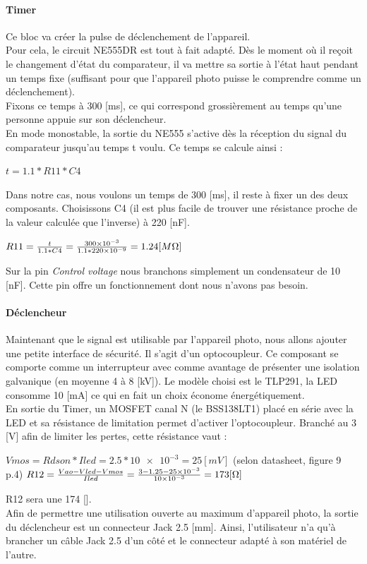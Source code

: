 \documentclass[a4paper,10pt]{article}
\begin{document}
\paragraph{Timer}
Ce bloc va créer la pulse de déclenchement de l'appareil. \\
Pour cela, le circuit NE555DR est tout à fait adapté. Dès le moment où il reçoit le changement d'état du comparateur, il va mettre sa sortie à l'état haut pendant un temps fixe (suffisant pour que l'appareil photo puisse le comprendre comme un déclenchement). \\
Fixons ce temps à 300 [ms], ce qui correspond grossièrement au temps qu'une personne appuie sur son déclencheur. \\
En mode monostable, la sortie du NE555 s'active dès la réception du signal du comparateur jusqu'au temps t voulu. Ce temps se calcule ainsi :
\begin{center}
 $ t = 1.1*R11*C4 $
\end{center}
Dans notre cas, nous voulons un temps de 300 [ms], il reste à fixer un des deux composants. Choisissons C4 (il est plus facile de trouver une résistance proche de la valeur calculée que l'inverse) à 220 [nF].
\begin{center}
 $ R11 = \frac{t}{1.1*C4} = \frac{\num{300e-3}}{1.1*\num{220e-9}} = 1.24 [M\ohm] $
\end{center}
Sur la pin {\itshape Control voltage} nous branchons simplement un condensateur de 10 [nF]. Cette pin offre un fonctionnement dont nous n'avons pas besoin.

\paragraph{Déclencheur}
Maintenant que le signal est utilisable par l'appareil photo, nous allons ajouter une petite interface de sécurité. Il s'agit d'un optocoupleur. Ce composant se comporte comme un interrupteur avec comme avantage de présenter une isolation galvanique (en moyenne 4 à 8 [kV]). Le modèle choisi est le TLP291, la LED consomme 10 [mA] ce qui en fait un choix économe énergétiquement. \\
En sortie du Timer, un MOSFET canal N (le BSS138LT1) placé en série avec la LED et sa résistance de limitation permet d'activer l'optocoupleur. Branché au 3 [V] afin de limiter les pertes, cette résistance vaut :
\begin{center}
 $ Vmos = Rdson * Iled = 2.5*\num{10e-3} = 25 [mV] $ (selon datasheet, figure 9 p.4)
 $ R12 = \frac{Vao-Vled-Vmos}{Iled} = \frac{3-1.25-\num{25e-3}}{\num{10e-3}} = 173 [\ohm] $
\end{center}
R12 sera une 174 [\ohm].\\
Afin de permettre une utilisation ouverte au maximum d'appareil photo, la sortie du déclencheur est un connecteur Jack 2.5 [mm]. Ainsi, l'utilisateur n'a qu'à brancher un câble Jack 2.5 d'un côté et le connecteur adapté à son matériel de l'autre.
\end{document}
